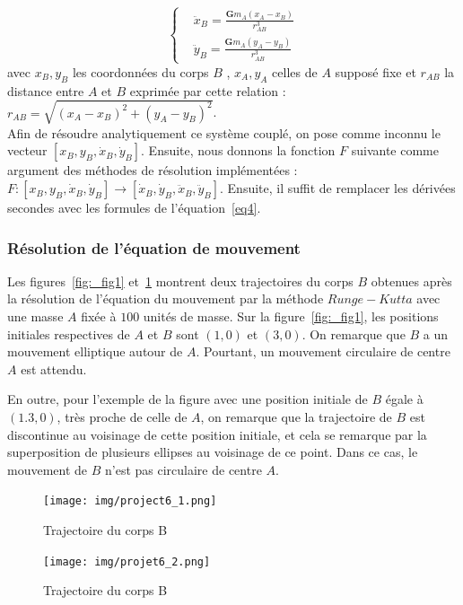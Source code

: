\documentclass{article}
\begin{document}
\begin{equation}\label{eq4}
\left\{
\begin{aligned}
& \ddot x_{B}  = \frac{\mathbf{G} m_{A} (x_{A} - x_{B}) }{r_{AB}^{3}}\\
& \ddot y_{B}  = \frac{\mathbf{G} m_{A} (y_{A} - y_{B}) }{r_{AB}^{3}}
\end{aligned}
\right.
\end{equation}
avec $x_{B}, y_{B}$ les coordonnées du corps $B$ , $x_{A}, y_{A}$ celles de $A$ supposé fixe et $r_{AB}$ la distance entre $A$ et $B$ exprimée par cette relation : $r_{AB} = \sqrt{(x_{A} - x_{B})^{2} + (y_{A} - y_{B})^{2}}$.\\

Afin de résoudre analytiquement ce système couplé, on pose comme inconnu le vecteur $[x_{B},
y_{B}, \dot x_{B},\dot y_{B}]$. Ensuite, nous donnons la fonction $F$ suivante comme argument des méthodes de résolution implémentées : $F : [x_{B}, y_{B}, \dot x_{B},\dot y_{B}] \longrightarrow [\dot x_{B},\dot y_{B}, \ddot x_{B},\ddot y_{B}] $. Ensuite, il suffit de remplacer les dérivées secondes avec les formules de l'équation~\ref{eq4}.

\subsubsection{Résolution de l'équation de mouvement}
Les figures~\ref{fig:_fig1} et~\ref{fig:_fig2} montrent deux trajectoires du corps $B$ obtenues après la résolution de l'équation du mouvement par la méthode $Runge-Kutta$ avec une masse $A$ fixée à $100$ unités de masse. Sur la figure~\ref{fig:_fig1}, les positions initiales respectives de $A$ et $B$ sont $(1,0)$ et $(3,0)$. On remarque que $B$ a un mouvement elliptique autour de $A$. Pourtant, un mouvement circulaire de centre $A$ est attendu. 

En outre, pour l'exemple de la figure avec une position initiale de $B $ égale à $(1.3, 0)$, très proche de celle de $A$, on remarque que la trajectoire de $B$ est discontinue au voisinage de cette position initiale, et cela se remarque par la superposition de plusieurs ellipses au voisinage de ce point. Dans ce cas, le mouvement de $B$ n'est pas circulaire de centre $A$.
            \begin{figure}[h]
                \begin{minipage}[c]{.4\linewidth}
                    \texttt{[image: img/project6\_1.png]}
                    \caption{Trajectoire du corps B}
                    \label{fig:_fig1}
                \end{minipage}
            \hfill%
                \begin{minipage}[c]{.4\linewidth}
                    \texttt{[image: img/projet6\_2.png]}
                    \caption{Trajectoire du corps B}
                    \label{fig:_fig2}
                \end{minipage} 
            \end{figure}
\end{document}
